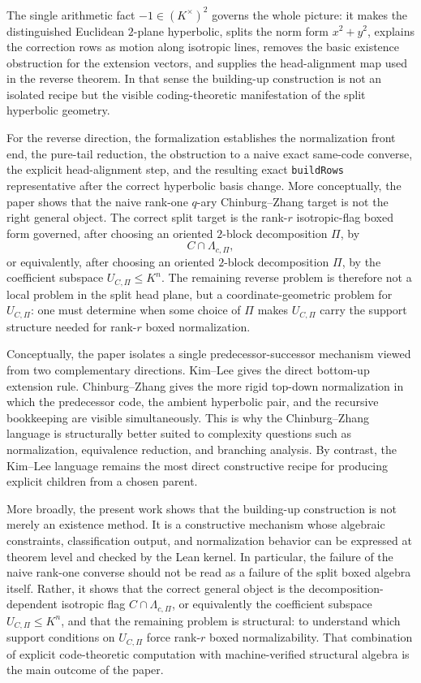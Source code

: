\documentclass[12pt]{article}
\begin{document}
The single arithmetic fact $-1\in (K^\times)^2$ governs the whole picture: it makes the distinguished Euclidean $2$-plane hyperbolic, splits the norm form $x^2+y^2$, explains the correction rows as motion along isotropic lines, removes the basic existence obstruction for the extension vectors, and supplies the head-alignment map used in the reverse theorem. In that sense the building-up construction is not an isolated recipe but the visible coding-theoretic manifestation of the split hyperbolic geometry.

For the reverse direction, the formalization establishes the normalization front end, the pure-tail reduction, the obstruction to a naive exact same-code converse, the explicit head-alignment step, and the resulting exact \texttt{buildRows} representative after the correct hyperbolic basis change. More conceptually, the paper shows that the naive rank-one \(q\)-ary Chinburg--Zhang target is not the right general object. The correct split target is the rank-\(r\) isotropic-flag boxed form governed, after choosing an oriented \(2\)-block decomposition \(\Pi\), by
\[
 C\cap \Lambda_{c,\Pi},
\]
or equivalently, after choosing an oriented \(2\)-block decomposition \(\Pi\), by the coefficient subspace \(U_{C,\Pi}\le K^n\). The remaining reverse problem is therefore not a local problem in the split head plane, but a coordinate-geometric problem for \(U_{C,\Pi}\): one must determine when some choice of \(\Pi\) makes \(U_{C,\Pi}\) carry the support structure needed for rank-\(r\) boxed normalization.

Conceptually, the paper isolates a single predecessor-successor mechanism viewed from two complementary directions. Kim--Lee gives the direct bottom-up extension rule. Chinburg--Zhang gives the more rigid top-down normalization in which the predecessor code, the ambient hyperbolic pair, and the recursive bookkeeping are visible simultaneously. This is why the Chinburg--Zhang language is structurally better suited to complexity questions such as normalization, equivalence reduction, and branching analysis. By contrast, the Kim--Lee language remains the most direct constructive recipe for producing explicit children from a chosen parent.

More broadly, the present work shows that the building-up construction is not merely an existence method. It is a constructive mechanism whose algebraic constraints, classification output, and normalization behavior can be expressed at theorem level and checked by the Lean kernel. In particular, the failure of the naive rank-one converse should not be read as a failure of the split boxed algebra itself. Rather, it shows that the correct general object is the decomposition-dependent isotropic flag \(C\cap \Lambda_{c,\Pi}\), or equivalently the coefficient subspace \(U_{C,\Pi}\le K^n\), and that the remaining problem is structural: to understand which support conditions on \(U_{C,\Pi}\) force rank-\(r\) boxed normalizability. That combination of explicit code-theoretic computation with machine-verified structural algebra is the main outcome of the paper.
\end{document}
